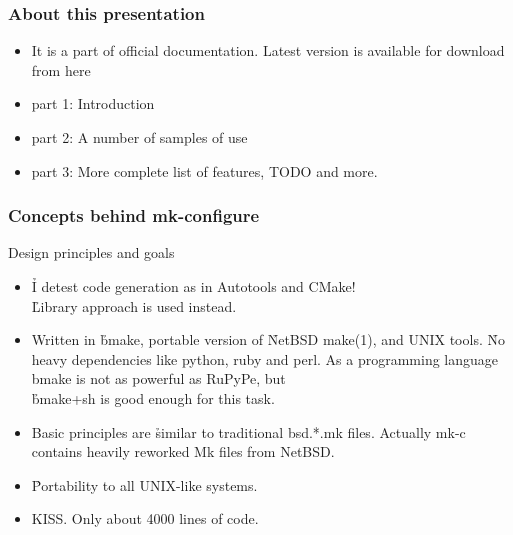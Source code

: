 \documentclass[hyperref={colorlinks=true}]{beamer}
\begin{document}
\begin{frame}
  \frametitle{About this presentation}
  \begin{block}{}
    \begin{itemize}
    \item It is a part of official documentation.
      Latest version is available for download from here\\
    \item part 1: Introduction
    \item part 2: A number of samples of use
    \item part 3: More complete list of features, TODO and more.
    \end{itemize}
  \end{block}
\end{frame}

\begin{frame}
  \frametitle{Concepts behind mk-configure}
  \begin{block}{Design principles and goals}
    \begin{itemize}
    \item \h{I detest code generation} as in Autotools and CMake!\\
      \h{Library approach} is used instead.
    \item Written in \h{bmake}, portable version of \h{NetBSD make(1)},
      and UNIX tools. \h{No heavy dependencies} like python, ruby and perl.
      As a programming language
      bmake is not as powerful as RuPyPe, but\\
      \h{\mbox{bmake+sh} is good enough} for this task.
    \item Basic principles are \h{similar to
      traditional \mbox{bsd.*.mk} files}.
      Actually mk-c contains heavily reworked Mk files from NetBSD.
    \item \h{Portability} to all UNIX-like systems.
    \item KISS.  Only about 4000 lines of code.
    \end{itemize}
  \end{block}
\end{frame}
\end{document}
